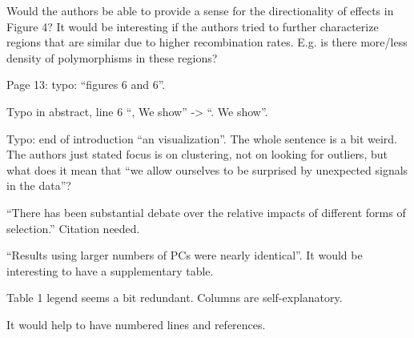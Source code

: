 \begin{point}{}
Would the authors be able to provide a sense for the directionality of effects in Figure 4? It
would be interesting if the authors tried to further characterize regions that are similar due to
higher recombination rates. E.g. is there more/less density of polymorphisms in these regions?
\end{point}

\begin{point}{Page 13:}
typo: ``figures 6 and 6''.
\end{point}

\begin{point}{}
Typo in abstract, line 6 ``, We show'' -> ``. We show''.
\end{point}

\begin{point}{}
Typo: end of introduction ``an visualization''. The whole sentence is a bit weird. The authors just
stated focus is on clustering, not on looking for outliers, but what does it mean that ``we allow
ourselves to be surprised by unexpected signals in the data''?
\end{point}

\begin{point}{}
``There has been substantial debate over the relative impacts of different forms of selection.''
Citation needed.
\end{point}

\begin{point}{}
``Results using larger numbers of PCs were nearly identical''. It would be interesting to have a
supplementary table.
\end{point}

\begin{point}{}
Table 1 legend seems a bit redundant. Columns are self-explanatory.
\end{point}

\begin{point}{}
It would help to have numbered lines and references.
\end{point}

